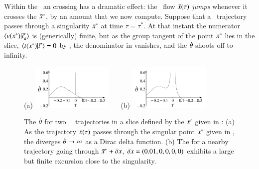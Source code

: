 \documentclass[preprint,12pt]{elsarticle} %
\begin{document}
Within the \reducedsp\  an {\sset} crossing has a dramatic effect: the
\reducedsp\ flow $\bar{x}(\tau)$ \emph{jumps} whenever it crosses the
{\sset} $\bar{x}^*$, by an amount that we now compute.
Suppose that a \reducedsp\ trajectory passes through a singularity
$\bar{x}^*$ at time $\tau=\tau^*$. At
that instant the numerator $\braket{\vel(\sspRSing)}{\sliceTan{a}}$ is
(generically) finite, but as the group tangent of the point $\bar{x}^*$
lies in the slice, ${\braket{\groupTan_{}(\sspRSing)}{\sliceTan{}}}=0$
by , the denominator in  vanishes,
and the {\angVel} $\dot{{\bf \theta}}$ shoots off to infinity.

 \begin{figure}
 \begin{center}
(a) \includegraphics[width=0.35\textwidth]{dthetasing}%
~~
(b) \includegraphics[width=0.35\textwidth]{dthetanearsing}%
 \end{center}
 \caption{\label{fig:dthetasing}
The {\angVel} $\dot{{\bf \theta}}$ for two \cLf\
\reducedsp\ trajectories in a slice defined by the
{\template} $\bar{x}'$ given in :
 (a) As the trajectory $\bar{x}(\tau)$ passes through the
singular point  $\bar{x}^*$ given in \refeq{exmplTempl},
the {\angVel} diverges
$\dot{{\bf \theta}} \to \infty$ as a Dirac delta function.
(b) The {\angVel} for a nearby trajectory going
through $\bar{x}^*+\delta x$,
$\delta x=(0.01,0,0,0,0)$ exhibits a large
but finite excursion close to the singularity.
 }%
 \end{figure}
\end{document}
